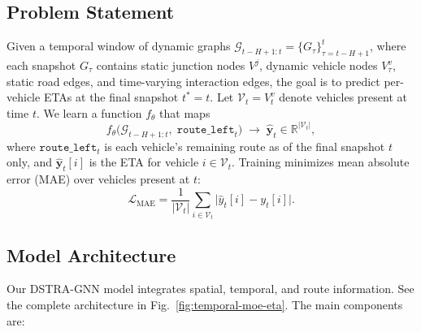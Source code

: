 \documentclass[pdflatex,sn-basic,Numbered]{sn-jnl}%
\begin{document}
\subsection{Problem Statement}
Given a temporal window of dynamic graphs $\mathcal{G}_{t-H+1:t}=\{G_{\tau}\}_{\tau=t-H+1}^{t}$, where each snapshot $G_{\tau}$ contains static junction nodes $V^{j}$, dynamic vehicle nodes $V^{v}_{\tau}$, static road edges, and time-varying interaction edges, the goal is to predict per-vehicle ETAs at the final snapshot $t^*{=}t$. Let $\mathcal{V}_t = V^{v}_{t}$ denote vehicles present at time $t$. We learn a function $f_{\theta}$ that maps
\begin{equation}
f_{\theta}\big(\mathcal{G}_{t-H+1:t},\;\texttt{route\_left}_t\big) \;\to\; \hat{\mathbf{y}}_t \in \mathbb{R}^{|\mathcal{V}_t|},
\end{equation}
where $\texttt{route\_left}_t$ is each vehicle's remaining route as of the final snapshot $t$ only, and $\hat{\mathbf{y}}_t[i]$ is the ETA for vehicle $i\in\mathcal{V}_t$. Training minimizes mean absolute error (MAE) over vehicles present at $t$:
\begin{equation}
\mathcal{L}_{\text{MAE}} = \frac{1}{|\mathcal{V}_t|}\sum_{i\in\mathcal{V}_t} \big| \hat{y}_t[i] - y_t[i] \big|.
\end{equation}

\subsection{Model Architecture}
Our DSTRA-GNN model integrates spatial, temporal, and route information. See the complete architecture in Fig.~\ref{fig:temporal-moe-eta}. The main components are:
\end{document}
